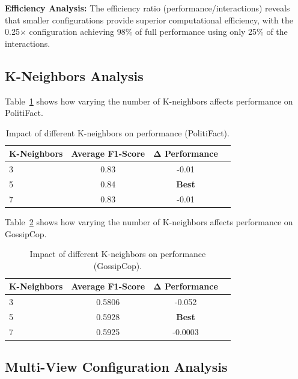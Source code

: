 \textbf{Efficiency Analysis:} The efficiency ratio (performance/interactions) reveals that smaller configurations provide superior computational efficiency, with the 0.25× configuration achieving 98\% of full performance using only 25\% of the interactions.


\subsection{K-Neighbors Analysis}

Table~\ref{tab:hyperparameter_k_neighbors_politifact} shows how varying the number of K-neighbors affects performance on PolitiFact.

\begin{table}[htbp]
\centering
\caption{Impact of different K-neighbors on performance (PolitiFact).}
\label{tab:hyperparameter_k_neighbors_politifact}
\begin{tabular}{lccc}
\toprule
\textbf{K-Neighbors} & \textbf{Average F1-Score} & \textbf{Δ Performance} \\
\midrule
3 & 0.83 & -0.01 \\
5 & 0.84 & \textbf{Best} \\
7 & 0.83 & -0.01 \\
\bottomrule
\end{tabular}
\end{table}


Table~\ref{tab:hyperparameter_k_neighbors_gossipcop} shows how varying the number of K-neighbors affects performance on GossipCop.

\begin{table}[htbp]
\centering
\caption{Impact of different K-neighbors on performance (GossipCop).}
\label{tab:hyperparameter_k_neighbors_gossipcop}
\begin{tabular}{lccc}
\toprule
\textbf{K-Neighbors} & \textbf{Average F1-Score} & \textbf{Δ Performance} \\
\midrule
3 & 0.5806 & -0.052 \\
5 & 0.5928 & \textbf{Best} \\
7 & 0.5925 & -0.0003 \\
\bottomrule
\end{tabular}
\end{table}

\subsection{Multi-View Configuration Analysis}


